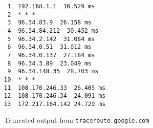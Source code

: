 \begin{figure}
    \centering
    \begin{verbatim}
 1  192.168.1.1  16.529 ms
 2  * * *
 3  96.34.83.9  26.158 ms
 4  96.34.84.212  30.452 ms
 5  96.34.2.142  31.084 ms
 6  96.34.0.51  31.012 ms
 7  96.34.0.137  27.184 ms
 8  96.34.3.89  23.049 ms
 9  96.34.148.35  28.703 ms
10  * * *
11  108.170.246.33  26.405 ms
12  108.170.246.34  24.091 ms
13  172.217.164.142 24.720 ms
    \end{verbatim}
    \caption{Truncated output from \texttt{traceroute google.com}}
    \label{fig:sample_traceroute}
\end{figure}
